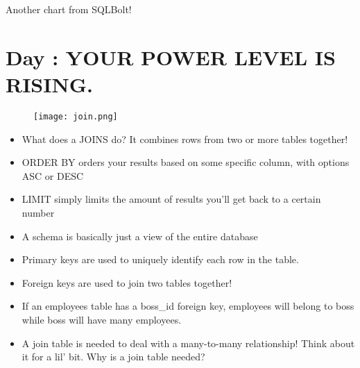 \documentclass{42-en}
\begin{document}
	   Another chart from SQLBolt!

\nextexercice


\chapter{Day \exercicenumber: YOUR POWER LEVEL IS RISING. }

\makeheaderfiles

            \begin{figure}[H]
                \begin{center}
                    \texttt{[image: join.png]}
                \end{center}
            \end{figure}

	\begin{itemize}\itemsep1pt 
		\item What does a JOINS do? It combines rows from two or more tables together! 
		\item ORDER BY orders your results based on some specific column, with options ASC or DESC
		\item LIMIT simply limits the amount of results you'll get back to a certain number
		\item A schema is basically just a view of the entire database 
		\item Primary keys are used to uniquely identify each row in the table. 
		\item Foreign keys are used to join two tables together!
		\item If an employees table has a boss\_id foreign key, employees will belong to boss while boss will have 
			many employees. 
		\item A join table is needed to deal with a many-to-many relationship! Think about it for a lil' bit. 
			Why is a join table needed? 
	\end{itemize}
\end{document}
